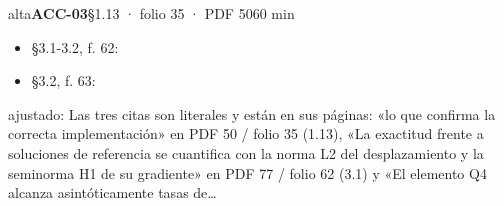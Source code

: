 \begin{ficha}{alta}{\casilla\textbf{ACC-03}\quad{}\quad §1.13 · folio 35 · PDF 50\hfill 60 min}
\begin{itemize}[leftmargin=1.2em,itemsep=1pt,topsep=1pt]
\item {\small §3.1-3.2, f. 62: }
\item {\small §3.2, f. 63: }
\end{itemize}
{\footnotesize\color{gris}ajustado: Las tres citas son literales y están en sus páginas: «lo que confirma la correcta implementación» en PDF 50 /\allowbreak{} folio 35 (1.13), «La exactitud frente a soluciones de referencia se cuantifica con la norma L2 del desplazamiento y la seminorma H1 de su gradiente» en PDF 77 /\allowbreak{} folio 62 (3.1) y «El elemento Q4 alcanza asintóticamente tasas de…\par}
\end{ficha}
